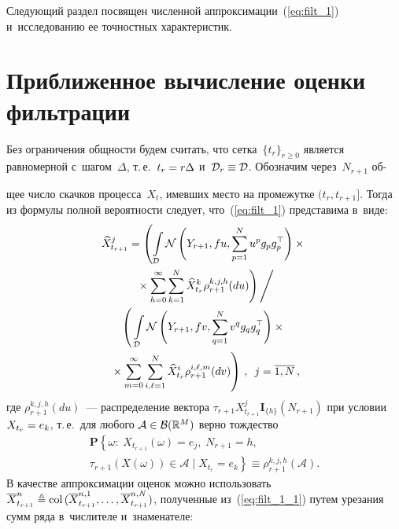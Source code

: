 \begin{multicols}{2}
{ }
 
 Следующий раздел посвящен численной аппроксимации~(\ref{eq:filt_1}) и~исследованию 
 ее точностных характеристик.
 
 \section{Приближенное вычисление оценки фильтрации}
 
 Без ограничения общности будем считать, что сетка~$\{t_r\}_{r \geqslant 0}$ 
 является равномерной с~шагом~$\Delta$, т.\,е.\ $t_r \hm= r \Delta$ 
 и~$\mathcal{D}_r \hm\equiv \mathcal{D}$.
 Обозначим через~$N_{r+1}$ об-\linebreak\vspace*{-12pt}
 
 \pagebreak
 
 \noindent
 щее число скачков процесса~$X_t$, имевших место 
 на промежутке $(t_r,t_{r+1}]$. Тогда из формулы полной вероятности следует, 
 что~(\ref{eq:filt_1}) представима в~виде:
 \begin{multline}
 \widehat{X}_{t_{r+1}}^j =  \left(
 \int\limits_{\mathcal{D}} 
 \mathcal{N}\left(Y_{r+1},f u,\sum\limits_{p=1}^N u^p g_pg_p^{\top}\right)\times{}\right.\\
\left. {}\times
 \sum\limits_{h=0}^{\infty}\sum\limits_{k=1}^N \widehat{X}_{t_r}^k
 \rho^{k,j,h}_{r+1}(du)
 \right)\Bigg/ \\
 \left(
 \vphantom{\sum\limits_{m=0}^{\infty}
 \sum\limits_{i,\ell=1}^N \widehat{X}_{t_r}^i
 \rho^{i,\ell,m}_{r+1}(dv)}
 \int\limits_{\mathcal{D}} 
 \mathcal{N}\left(Y_{r+1},f v,\sum\limits_{q=1}^N v^q g_qg_q^{\top}\right)\times{}\right.\\
\left.{}\times \sum\limits_{m=0}^{\infty}
 \sum\limits_{i,\ell=1}^N \widehat{X}_{t_r}^i
 \rho^{i,\ell,m}_{r+1}(dv)
 \right)
  \,, \enskip j = \overline{1,N}\,,
  \label{eq:filt_1_1}
 \end{multline}
 где 
 $ \rho^{k,j,h}_{r+1}(du)$~--- распределение вектора 
 $\tau_{r+1}X_{t_{r+1}}^{j}\mathbf{I}_{\{h\}}(N_{r+1})$ при 
 условии $X_{t_r}\hm=e_k$, т.\,е.\ 
 для любого $\mathcal{A} \hm\in \mathcal{B}(\mathbb{R}^M)$ верно тождество
\begin{multline*}
 \mathbf{P}\left\{\omega: \; X_{t_{r+1}}(\omega)=e_{j}, \; N_{r+1} = h,\right.\\ 
\left. \tau_{r+1}(X(\omega)) \in \mathcal{A}\;|\;X_{t_r}=e_k\right\} \equiv
  \rho^{k,j,h}_{r+1}(\mathcal{A}).
\end{multline*}
В качестве аппроксимации оценок можно использовать  
 $\overline{X}_{t_{r+1}}^n \triangleq 
 \mathrm{col}\,(\overline{X}_{t_{r+1}}^{n,1},\ldots,\overline{X}_{t_{r+1}}^{n,N})$, 
 полученные из~(\ref{eq:filt_1_1}) путем урезания сумм ряда в~числителе и~знаменателе:
 

\end{multicols}
